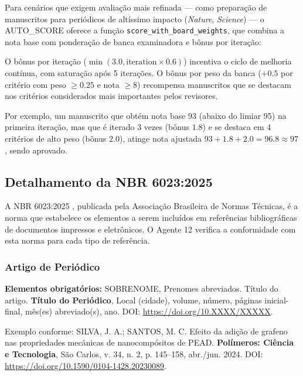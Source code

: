 Para cenários que exigem avaliação mais refinada — como preparação
de manuscritos para periódicos de altíssimo impacto (\textit{Nature},
\textit{Science}) — o AUTO\_SCORE oferece a função
\texttt{score\_with\_board\_weights}, que combina a nota base com
ponderação de banca examinadora e bônus por iteração:

O bônus por iteração ($\min(3.0, \text{iteration} \times 0.6)$)
incentiva o ciclo de melhoria contínua, com saturação após 5
iterações. O bônus por peso da banca ($+0.5$ por critério com peso
$\geq 0.25$ e nota $\geq 8$) recompensa manuscritos que se destacam
nos critérios considerados mais importantes pelos revisores.

Por exemplo, um manuscrito que obtém nota base 93 (abaixo do limiar
95) na primeira iteração, mas que é iterado 3 vezes (bônus $1.8$) e
se destaca em 4 critérios de alto peso (bônus $2.0$), atinge nota
ajustada $93 + 1.8 + 2.0 = 96.8 \approx 97$, sendo aprovado.


\subsection{Detalhamento da NBR 6023:2025}
\label{sec:nbr6023_detalhada}

A NBR 6023:2025 \cite{ABNT6023_2025}, publicada pela Associação
Brasileira de Normas Técnicas, é a norma que estabelece os
elementos a serem incluídos em referências bibliográficas de
documentos impressos e eletrônicos. O Agente 12 verifica a
conformidade com esta norma para cada tipo de referência.

\subsubsection{Artigo de Periódico}

\textbf{Elementos obrigatórios:} SOBRENOME, Prenomes abreviados.
Título do artigo. \textbf{Título do Periódico}, Local (cidade),
volume, número, páginas inicial-final, mês(es) abreviado(s), ano.
DOI: \url{https://doi.org/10.XXXX/XXXXX}.

Exemplo conforme: SILVA, J. A.; SANTOS, M. C. Efeito da adição de
grafeno nas propriedades mecânicas de nanocompósitos de PEAD.
\textbf{Polímeros: Ciência e Tecnologia}, São Carlos, v. 34, n. 2,
p. 145--158, abr./jun. 2024. DOI:
\url{https://doi.org/10.1590/0104-1428.20230089}.

